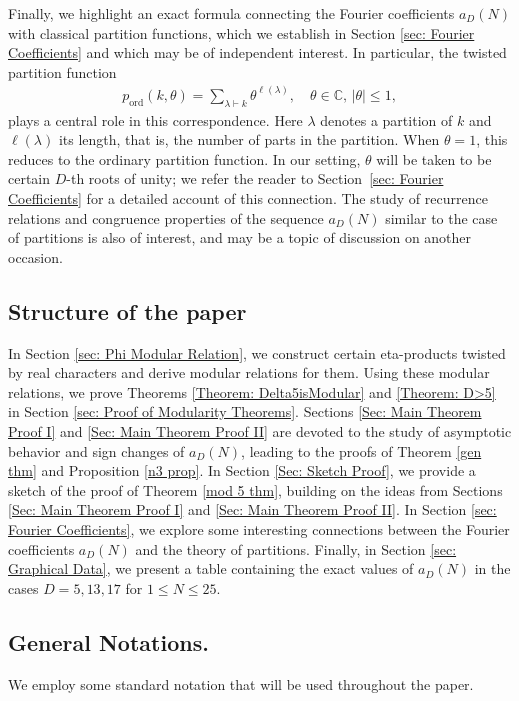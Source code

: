 \documentclass[11pt]{amsart}
\numberwithin{equation}{section}
\theoremstyle{remark}
\begin{document}
Finally, we highlight an exact formula connecting the Fourier coefficients $a_{D}(N)$ with classical partition functions, which we establish in Section \ref{sec: Fourier Coefficients} and which may be of independent interest. In particular, the twisted partition function
\begin{align}\label{Twisted Partition function}
p_{\textrm{ord}}(k,\theta) = \sum_{\lambda \vdash k} \theta^{\ell(\lambda)}, \quad \theta \in \mathbb{C}, \, |\theta| \le 1,
\end{align}
plays a central role in this correspondence. Here $\lambda$ denotes a partition of $k$ and $\ell(\lambda)$ its length, that is, the number of parts in the partition. When $\theta = 1$, this reduces to the ordinary partition function. In our setting, $\theta$ will be taken to be certain $D$-th roots of unity; we refer the reader to Section~\ref{sec: Fourier Coefficients} for a detailed account of this connection. The study of recurrence relations and congruence properties of the sequence $a_D(N)$ similar to the case of partitions is also of interest, and may be a topic of discussion on another occasion.

\subsection*{Structure of the paper} In Section \ref{sec: Phi Modular Relation}, we construct  certain eta-products twisted by real characters and derive modular relations for them. Using these modular relations, we prove Theorems \ref{Theorem: Delta5isModular} and \ref{Theorem: D>5} in Section \ref{sec: Proof of Modularity Theorems}. Sections \ref{Sec: Main Theorem Proof I} and \ref{Sec: Main Theorem Proof II} are devoted to the study of asymptotic behavior and sign changes of $a_D(N)$, leading to the proofs of Theorem \ref{gen thm} and Proposition \ref{n3 prop}. In Section \ref{Sec: Sketch Proof}, we provide a sketch of the proof of Theorem \ref{mod 5 thm}, building on the ideas from Sections \ref{Sec: Main Theorem Proof I} and \ref{Sec: Main Theorem Proof II}. In Section \ref{sec: Fourier Coefficients}, we explore some interesting connections between the Fourier coefficients \(a_{D}(N)\) and the theory of partitions. Finally, in Section \ref{sec: Graphical Data}, we present a table containing the exact values of \(a_{D}(N)\) in the cases \(D = 5, 13, 17\) for $1 \leq N \leq 25$.
\subsection*{General Notations.}
We employ some standard notation that will be used throughout the paper.
\end{document}
